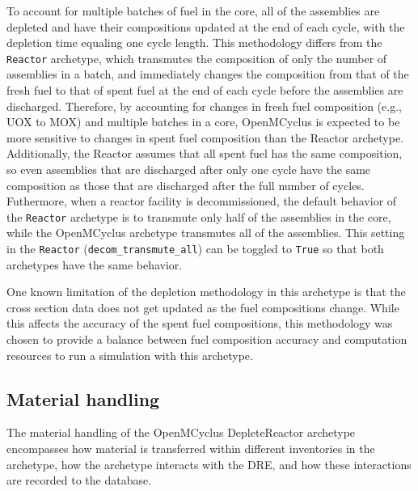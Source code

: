To account for multiple batches of fuel in the core, all of the assemblies 
are depleted and have their compositions updated 
at the end of each cycle, with the depletion time equaling one cycle 
length. This methodology differs from the \Cycamore 
\texttt{Reactor} archetype, which transmutes the composition of only the 
number of 
assemblies in a batch, and immediately changes the composition from that 
of the fresh fuel to that of spent fuel at the end of each cycle before the 
assemblies are discharged. Therefore, by accounting for 
changes in fresh fuel composition (e.g., UOX to MOX) and multiple 
batches in a core, OpenMCyclus is expected to be more sensitive to 
changes in spent fuel composition than the \Cycamore Reactor archetype. 
Additionally, the \Cycamore Reactor assumes that all spent fuel has the 
same composition, so even assemblies that are discharged after only one 
cycle have the same composition as those that are discharged after the
full number of cycles.
Futhermore, when a reactor facility is decommissioned, the default behavior 
of the \Cycamore \texttt{Reactor} archetype is to transmute only half of the 
assemblies in the core, while the OpenMCyclus archetype transmutes all of 
the assemblies. This setting in the \Cycamore \texttt{Reactor} 
(\texttt{decom\_transmute\_all}) can be toggled to \texttt{True} so that 
both archetypes have the same behavior.

One known limitation of the depletion methodology in this archetype 
is that the cross section data does not get updated as the 
fuel compositions change. While this affects the accuracy of the 
spent fuel compositions, this methodology was chosen to provide 
a balance between fuel composition accuracy and computation 
resources to run a simulation with this archetype. 

\subsection{Material handling}
The material handling of the OpenMCyclus DepleteReactor archetype 
encompasses how material is transferred within different inventories 
in the archetype, how the archetype interacts with the \gls{DRE}, 
and how these interactions are recorded to the database. 

